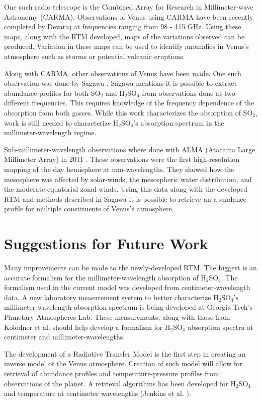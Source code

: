 One such radio telescope is the Combined Array for Research in Millimeter-wave Astronomy (CARMA). Observations of Venus using CARMA have been recently completed by Devaraj \cite{Devaraj-CARMA} at frequencies ranging from 98 - 115 GHz. Using these maps, along with the RTM developed, maps of the variations observed can be produced. Variation in these maps can be used to identify anomalies in Venus's atmosphere such as storms or potential volcanic eruptions.

Along with CARMA, other observations of Venus have been made. One such observation was done by Sagawa \cite{Sagawa-2008}. Sagawa mentions it is possible to extract abundance profiles for both SO$_2$ and H$_2$SO$_4$ from observations done at two different frequencies. This requires knowledge of the frequency dependence of the absorption from both gasses. While this work characterizes the absorption of SO$_2$, work is still needed to characterize H$_2$SO$_4$'s absorption spectrum in the millimeter-wavelength regime. 

Sub-millimeter-wavelength observations where done with ALMA (Atacama Large Millimeter Array) in 2011 \cite{ALMA-2013}. These observations were the first high-resolution mapping of the day hemisphere at mm-wavelengths. They showed how the mesosphere was affected by solar-winds, the mesospheric water distribution, and the moderate equatorial zonal winds. Using this data along with the developed RTM and methods described in Sagawa \cite{Sagawa-2008} it is possible to retrieve an abundance profile for multiple constituents of Venus's atmosphere.

\section{Suggestions for Future Work}
Many improvements can be made to the newly-developed RTM. The biggest is an accurate formalism for the millimeter-wavelength absorption of H$_2$SO$_4$. The formalism used in the current model was developed from centimeter-wavelength data. A new laboratory measurement system to better characterize H$_2$SO$_4$'s millimeter-wavelength absorption spectrum is being developed at Georgia Tech's Planetary Atmospheres Lab. These measurements, along with those from Kolodner et al. \cite{Kolodner-1998} should help develop a formalism for H$_2$SO$_4$ absorption spectra at centimeter and millimeter-wavelengths. 

The development of a Radiative Transfer Model is the first step in creating an inverse model of the Venus atmosphere. Creation of such model will allow for retrieval of abundance profiles and temperature-pressure profiles from observations of the planet. A retrieval algorithms has been developed for H$_2$SO$_4$ and temperature at centimeter wavelengths (Jenkins et al. \cite{Jenkins-2002}).